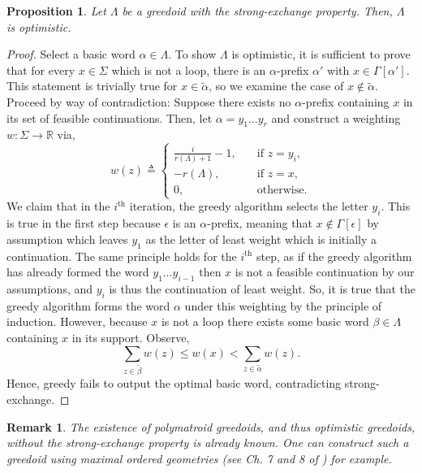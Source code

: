 \documentclass[11pt]{article}
\newtheorem{proposition}[theorem]{Proposition}
\newtheorem{remark}[theorem]{Remark}
\newcommand{\univ}{\Sigma}
\newcommand{\glang}{\Lambda}
\begin{document}
\begin{proposition}\label{prop:strong-exchange=>optimism}
    Let $\glang$ be a greedoid with the strong-exchange property.
    Then, $\glang$ is optimistic.
\end{proposition}
\begin{proof}
    Select a basic word $\alpha \in\glang$.
    To show $\glang$ is optimistic, it is sufficient to prove that for every $x \in \univ$ which is not a loop, there is an $\alpha$-prefix $\alpha'$ with $x \in \Gamma[\alpha']$.
    This statement is trivially true for $x \in \widetilde{\alpha}$, so we examine the case of $x \notin \widetilde{\alpha}$.
    Proceed by way of contradiction: Suppose there exists no $\alpha$-prefix containing $x$ in its set of feasible continuations.
    Then, let $\alpha = y_1\ldots y_r$ and construct a weighting $w:\univ\to\mathbb{R}$ via,
    \begin{equation*}
        w(z) \triangleq \begin{cases}
            \frac{i}{r(\glang)+1} - 1,\quad&\text{if } z = y_i,\\
            -r(\glang),\quad&\text{if }z = x,\\
            0,\quad&\text{otherwise}.
        \end{cases}
    \end{equation*}
    We claim that in the $i^\text{th}$ iteration, the greedy algorithm selects the letter $y_i$.
    This is true in the first step because $\epsilon$ is an $\alpha$-prefix, meaning that $x\notin\Gamma[\epsilon]$ by assumption which leaves $y_1$ as the letter of least weight which is initially a continuation.
    The same principle holds for the $i^\text{th}$ step, as if the greedy algorithm has already formed the word $y_1\ldots y_{i-1}$ then $x$ is not a feasible continuation by our assumptions, and $y_i$ is thus the continuation of least weight.
    So, it is true that the greedy algorithm forms the word $\alpha$ under this weighting by the principle of induction.
    However, because $x$ is not a loop there exists some basic word $\beta \in \glang$ containing $x$ in its support.
    Observe,
    \[
        \sum_{z \in \widetilde{\beta}}w(z) \leq w(x) < \sum_{z \in \widetilde{\alpha}} w(z).
    \]
    Hence, greedy fails to output the optimal basic word, contradicting strong-exchange.
\end{proof}
\begin{remark}\label{rem:optimism=/>strong-exchange}
    The existence of polymatroid greedoids, and thus optimistic greedoids, without the strong-exchange property is already known.
    One can construct such a greedoid using maximal ordered geometries (see Ch. 7 and 8 of \cite{korte2012greedoids}) for example.
\end{remark}
\end{document}
